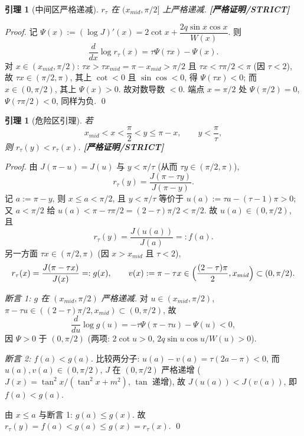 \documentclass[UTF8]{ctexart}
\newtheorem{lemma}[theorem]{引理}
\newcommand{\STRICT}{\textbf{[严格证明/STRICT]}}
\begin{document}
\begin{lemma}[中间区严格递减]\label{lem:decr}
	$r_\tau$ 在 $(x_{mid},\pi/2]$ 上严格递减. \STRICT{}
\end{lemma}

\begin{proof}
	记 $\Psi(x):=(\log J)'(x)=2\cot x+\dfrac{2q\sin x\cos x}{W(x)}$. 则
	\begin{equation}
		\frac{d}{dx}\log r_\tau(x)=\tau\Psi(\tau x)-\Psi(x).
	\end{equation}
	对 $x\in(x_{mid},\pi/2)$: $\tau x>\tau x_{mid}=\pi-x_{mid}>\pi/2$ 且
	$\tau x<\tau\pi/2<\pi$ (因 $\tau<2$), 故 $\tau x\in(\pi/2,\pi)$, 其上
	$\cot<0$ 且 $\sin\cos<0$, 得 $\Psi(\tau x)<0$; 而 $x\in(0,\pi/2)$, 其上
	$\Psi(x)>0$. 故对数导数 $<0$. 端点 $x=\pi/2$ 处
	$\Psi(\pi/2)=0$, $\Psi(\tau\pi/2)<0$, 同样为负. \qed
\end{proof}

\begin{lemma}[危险区引理]\label{lem:danger}
	若
	\begin{equation}
		x_{mid}<x<\frac\pi2<y\le\pi-x,\qquad y<\frac\pi\tau,
	\end{equation}
	则 $r_\tau(y)<r_\tau(x)$. \STRICT{}
\end{lemma}

\begin{proof}
	由 $J(\pi-u)=J(u)$ 与 $y<\pi/\tau$ (从而 $\tau y\in(\pi/2,\pi)$),
	\begin{equation}
		r_\tau(y)=\frac{J(\pi-\tau y)}{J(\pi-y)}.
	\end{equation}
	记 $a:=\pi-y$, 则 $x\le a<\pi/2$, 且 $y<\pi/\tau$ 等价于
	$u(a):=\tau a-(\tau-1)\pi>0$; 又 $a<\pi/2$ 给 $u(a)<\pi-\tau\pi/2=(2-\tau)\pi/2<\pi/2$.
	故 $u(a)\in(0,\pi/2)$, 且
	\begin{equation}
		r_\tau(y)=\frac{J(u(a))}{J(a)}=:f(a).
	\end{equation}
	另一方面 $\tau x\in(\pi/2,\pi)$ (因 $x>x_{mid}$ 且 $\tau<2$),
	\begin{equation}
		r_\tau(x)=\frac{J(\pi-\tau x)}{J(x)}=:g(x),\qquad
		v(x):=\pi-\tau x\in\Bigl(\frac{(2-\tau)\pi}2,x_{mid}\Bigr)\subset(0,\pi/2).
	\end{equation}

	\emph{断言 1: $g$ 在 $(x_{mid},\pi/2)$ 严格递减.} 对
	$u\in(x_{mid},\pi/2)$, $\pi-\tau u\in((2-\tau)\pi/2,x_{mid})\subset(0,\pi/2)$,
	故
	\begin{equation}
		\frac{d}{du}\log g(u)=-\tau\Psi(\pi-\tau u)-\Psi(u)<0,
	\end{equation}
	因 $\Psi>0$ 于 $(0,\pi/2)$ (两项: $2\cot u>0$, $2q\sin u\cos u/W(u)>0$).

	\emph{断言 2: $f(a)<g(a)$.} 比较两分子: $u(a)-v(a)=\tau(2a-\pi)<0$,
	而 $u(a),v(a)\in(0,\pi/2)$, $J$ 在 $(0,\pi/2)$ 严格递增
	($J(x)=\tan^2x/(\tan^2x+m^2)$, $\tan$ 递增), 故
	$J(u(a))<J(v(a))$, 即 $f(a)<g(a)$.

	由 $x\le a$ 与断言 1: $g(a)\le g(x)$. 故
	$r_\tau(y)=f(a)<g(a)\le g(x)=r_\tau(x)$. \qed
\end{proof}
\end{document}
